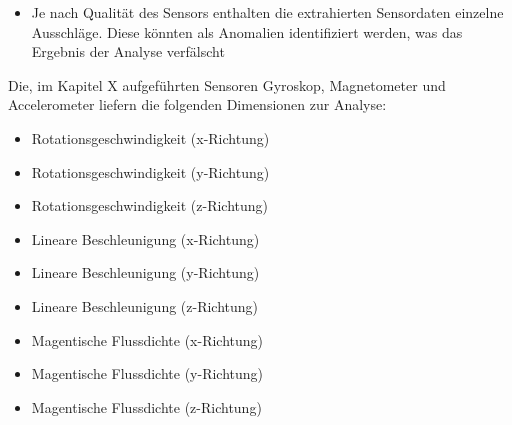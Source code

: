 \begin{itemize} 
\item Je nach Qualität des Sensors enthalten die extrahierten Sensordaten einzelne Ausschläge. Diese könnten als Anomalien identifiziert werden, was das Ergebnis der Analyse verfälscht
\end{itemize}
Die, im Kapitel X aufgeführten Sensoren Gyroskop, Magnetometer und Accelerometer liefern die folgenden Dimensionen zur Analyse:
\begin{itemize} 
\item Rotationsgeschwindigkeit (x-Richtung)
\item Rotationsgeschwindigkeit (y-Richtung)
\item Rotationsgeschwindigkeit (z-Richtung)
\item Lineare Beschleunigung (x-Richtung)
\item Lineare Beschleunigung (y-Richtung)
\item Lineare Beschleunigung (z-Richtung)
\item Magentische Flussdichte (x-Richtung)
\item Magentische Flussdichte (y-Richtung)
\item Magentische Flussdichte (z-Richtung)
\end{itemize}